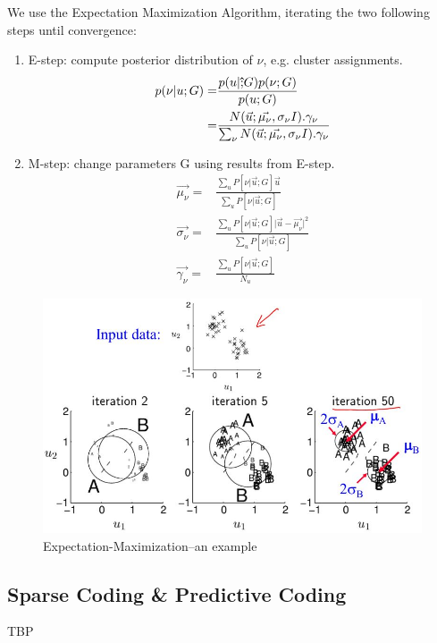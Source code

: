 \documentclass[]{article}
\begin{document}
\begin{figure}[H]
\begin{subfigure}[t]{0.45\textwidth}
	\end{subfigure}
\end{figure}

We use the Expectation Maximization Algorithm, iterating the two following steps until convergence:
\begin{enumerate}
	\item E-step: compute posterior distribution of $\nu$, e.g. cluster assignments.
	\begin{align*}
		p(\nu\vert u;G)=&\frac{p(u\vert \vu ;G) p(\nu;G)}{p(u;G)}\\
		=&\frac{N(\vec{u};\vec{\mu_\nu},\sigma_\nu I).\gamma_\nu}{\sum_\nu N(\vec{u};\vec{\mu_\nu},\sigma_\nu I).\gamma_\nu}
	\end{align*}
	\item M-step: change parameters G using results from E-step.
	\begin{align*}
		\vec{\mu_\nu} =&\frac{\sum_u P[\nu\vert \vec{u};G]\vec{u}}{\sum_u P[\nu\vert \vec{u};G]}\\
		\vec{\sigma_\nu} =&\frac{\sum_u P[\nu\vert \vec{u};G]\lvert \vec{u}-\vec{\mu_\nu}\rvert^2 }{\sum_u P[\nu\vert \vec{u};G]}\\
		\vec{\gamma_\nu} =&\frac{\sum_u P[\nu\vert \vec{u};G]}{N_u}
	\end{align*}
\end{enumerate}

\begin{figure}[H]
	\begin{center}
		\caption{Expectation-Maximization--an example}
		\includegraphics[width=\textwidth]{em-results}
	\end{center}
\end{figure}

\subsection{Sparse Coding \& Predictive Coding}
TBP
\end{document}
